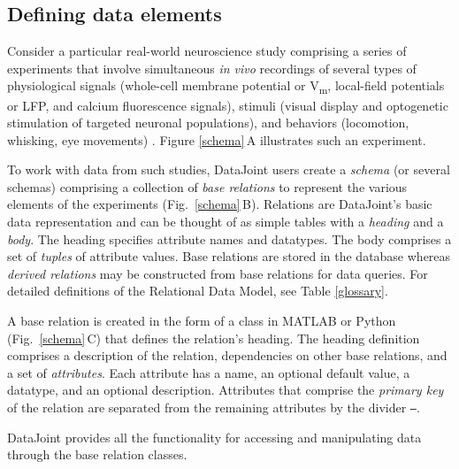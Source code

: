 \subsection*{Defining data elements}

 

Consider a particular real-world neuroscience study comprising a series of experiments that involve simultaneous \emph{in vivo} recordings of several types of physiological signals (whole-cell membrane potential or V\textsubscript{m}, local-field potentials or LFP, and calcium fluorescence signals), stimuli (visual display and optogenetic stimulation of targeted neuronal populations), and behaviors (locomotion, whisking, eye movements) \cite{reimer_pupil_2014}. 
Figure \ref{schema}\,A illustrates such an experiment.

To work with data from such studies, DataJoint users create a \emph{schema} (or several schemas) comprising a collection of \emph{base relations} to represent the various elements of the experiments (Fig.\ \ref{schema}\,B).
Relations are DataJoint's basic data representation and can be thought of as simple tables with a \emph{heading} and a \emph{body}.
The heading specifies attribute names and datatypes. 
The body comprises a set of \emph{tuples} of attribute values. 
Base relations are stored in the database whereas \emph{derived relations} may be constructed from base relations for data queries.
For detailed definitions of the Relational Data Model, see Table \ref{glossary}.



A base relation is created in the form of a class in MATLAB or Python (Fig.\ \ref{schema}\,C) that defines the relation's heading.
The heading definition comprises a description of the relation, dependencies on other base relations, and a set of \emph{attributes}. 
Each attribute has a name, an optional default value, a datatype, and an optional description.
Attributes that comprise the \emph{primary key} of the relation are separated from the remaining attributes by the divider {\tt---}.

DataJoint provides all the functionality for accessing and manipulating data through the base relation classes. 

